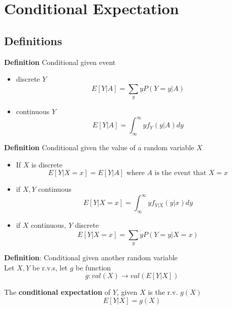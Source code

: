 \chapter{Conditional Expectation}

\section{Definitions}
\begin{framed}
   \textbf{Definition} Conditional given event
   \begin{itemize}
      \item discrete $Y$ 
         \[
            E[Y |A ] = \sum_{y} y P(Y = y |A)
         \] 
      \item continuous $Y$ 
         \[
            E[Y |A ] = \int_{\infty}^{\infty} yf_Y(y | A) dy  
         \] 
   \end{itemize}
     
\end{framed}

\begin{framed}

   \textbf{Definition} Conditional given the value of a random variable $X$
   \begin{itemize}
      \item If $X$ is discrete
         \[
            E[Y |X = x ] = E[Y |A] \text{ where $A$ is the event that $X = x$}
         \] 
      \item if $X, Y$ continuous
         \[
            E[Y |X = x ] = \int_{\infty}^{\infty} yf_{Y|X}(y | x) dy  
         \] 
      \item if $X$ continuous, $Y$ discrete
         \[
            E[Y |X = x ] = \sum_{y } y P(Y = y | X = x) 
         \] 
   \end{itemize}
   
   \textbf{Definition}: Conditional given another random variable \\

   Let $X, Y$ be r.v.s, let $g$ be function
   \[
      g: val(X) \rightarrow val(E[Y|X])
   \] 
  
\end{framed}
   
\begin{framed}

   The \textbf{conditional expectation} of $Y$, given $X$ is the r.v. $g(X)$
    \[
       E[Y | X] = g(X)
   \] 
\end{framed}


